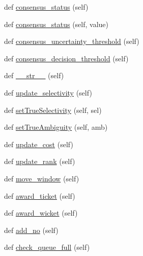 \begin{DoxyCompactItemize}
\item 
def \hyperlink{classdynamicfilterapp_1_1models_1_1_predicate_aa052e06571748727ad162068d955009b}{consensus\+\_\+status} (self)
\item 
def \hyperlink{classdynamicfilterapp_1_1models_1_1_predicate_a17886248032e85320808da26e5254fff}{consensus\+\_\+status} (self, value)
\item 
def \hyperlink{classdynamicfilterapp_1_1models_1_1_predicate_abb47f59cdc395b26b76297491b95d603}{consensus\+\_\+uncertainty\+\_\+threshold} (self)
\item 
def \hyperlink{classdynamicfilterapp_1_1models_1_1_predicate_abeb36f0601037cc6f8066fdb9dea2cc3}{consensus\+\_\+decision\+\_\+threshold} (self)
\item 
def \hyperlink{classdynamicfilterapp_1_1models_1_1_predicate_a23e8041ce1015febe4fdace3225714f9}{\+\_\+\+\_\+str\+\_\+\+\_\+} (self)
\item 
def \hyperlink{classdynamicfilterapp_1_1models_1_1_predicate_a20d11566ab0f56ccf8baac7a18809185}{update\+\_\+selectivity} (self)
\item 
def \hyperlink{classdynamicfilterapp_1_1models_1_1_predicate_a846159dde6bc49c65012e40cf2643958}{set\+True\+Selectivity} (self, sel)
\item 
def \hyperlink{classdynamicfilterapp_1_1models_1_1_predicate_aec5ecc4928cd887effbee7c856705901}{set\+True\+Ambiguity} (self, amb)
\item 
def \hyperlink{classdynamicfilterapp_1_1models_1_1_predicate_a848ee4c7a2121d6e272137b6d3c8b843}{update\+\_\+cost} (self)
\item 
def \hyperlink{classdynamicfilterapp_1_1models_1_1_predicate_ab9e5706b198fa9e44ba1560ac6ed6687}{update\+\_\+rank} (self)
\item 
def \hyperlink{classdynamicfilterapp_1_1models_1_1_predicate_a8a786176b300908a48478d640cd17e87}{move\+\_\+window} (self)
\item 
def \hyperlink{classdynamicfilterapp_1_1models_1_1_predicate_a532e4b5776e0364bd6c0b79bc06dce03}{award\+\_\+ticket} (self)
\item 
def \hyperlink{classdynamicfilterapp_1_1models_1_1_predicate_aae60ca5acfd2133e3c3938aa8013bbb8}{award\+\_\+wicket} (self)
\item 
def \hyperlink{classdynamicfilterapp_1_1models_1_1_predicate_adae340e94226ce820610efca7daf16e3}{add\+\_\+no} (self)
\item 
def \hyperlink{classdynamicfilterapp_1_1models_1_1_predicate_a5e4bd5c707fd3d9a4b5a729afea6ab95}{check\+\_\+queue\+\_\+full} (self)

\end{DoxyCompactItemize}
